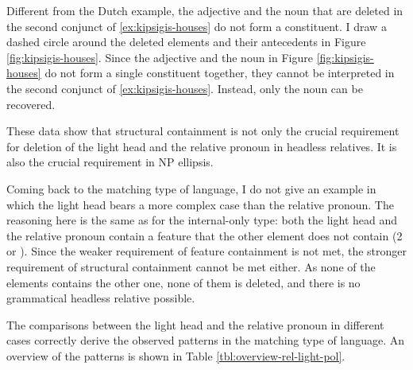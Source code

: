 Different from the Dutch example, the adjective and the noun that are deleted in the second conjunct of \ref{ex:kipsigis-houses} do not form a constituent. I draw a dashed circle around the deleted elements and their antecedents in Figure \ref{fig:kipsigis-houses}. Since the adjective and the noun in Figure \ref{fig:kipsigis-houses} do not form a single constituent together, they cannot be interpreted in the second conjunct of \ref{ex:kipsigis-houses}. Instead, only the noun can be recovered.

These data show that structural containment is not only the crucial requirement for deletion of the light head and the relative pronoun in headless relatives. It is also the crucial requirement in NP ellipsis.

Coming back to the matching type of language, I do not give an example in which the light head bears a more complex case than the relative pronoun. The reasoning here is the same as for the internal-only type: both the light head and the relative pronoun contain a feature that the other element does not contain (2 or ). Since the weaker requirement of feature containment is not met, the stronger requirement of structural containment cannot be met either. As none of the elements contains the other one, none of them is deleted, and there is no grammatical headless relative possible.

The comparisons between the light head and the relative pronoun in different cases correctly derive the observed patterns in the matching type of language. An overview of the patterns is shown in Table \ref{tbl:overview-rel-light-pol}.

